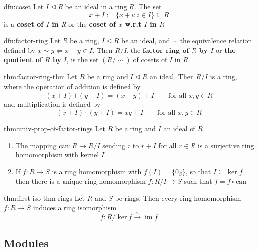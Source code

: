 \documentclass[landscape, 8pt]{extarticle}
\DeclareMathOperator{\im}{im}
\begin{document}
\begin{multicols}{3}
\begin{dfn}[Coset]{dfn:coset}{}
    Let $I \unlhd R$ be an ideal in a ring $R$. The set
    \[ x + I := \{x + i : i\in I\} \subseteq R\]
    is a \textbf{coset of $I$ in $R$} or the \textbf{coset of $x$ w.r.t $I$ in $R$}
\end{dfn}

\begin{dfn}{dfn:factor-ring}{}
    Let $R$ be a ring, $I \unlhd R$ be an ideal, and $\sim$ the equivalence relation defined by $x \sim y \iff x - y \in I$. Then $R / I$, the \textbf{factor ring of $R$ by $I$} or \textbf{the quotient of $R$ by $I$}, is the set $(R / \sim)$ of cosets of $I$ in $R$
\end{dfn}

\begin{thm}[]{thm:factor-ring-thm}{}
    Let $R$ be a ring and $I \unlhd R$ an ideal. Then $R / I$ is a ring, where the operation of addition is defined by
    \[(x + I) \dot{+} (y + I) = (x + y) + I \qquad \text{for all $x,y\in R$}\]
    and multiplication is defined by
    \[(x + I) \cdot (y + I) = xy + I \qquad \text{for all $x,y\in R$}\]
\end{thm}

\begin{thm}{thm:univ-prop-of-factor-rings}{}
    Let $R$ be a ring and $I$ an ideal of $R$
    \begin{enumerate}
        \setlength\itemsep{0em}
        \item The mapping $\text{can}: R \to R / I$ sending $r$ to $r + I$ for all $r\in R$ is a surjective ring homomorphism with kernel $I$
        \item If $f : R \to S$ is a ring homomorphism with $f(I) = \{0_{S}\}$, so that $I \subseteq \ker f$ then there is a unique ring homomorphism $f : R / I \to S$ such that $f = \overline{f} \circ \text{can}$
    \end{enumerate}
\end{thm}

\begin{thm}{thm:first-iso-thm-rings}{}
    Let $R$ and $S$ be rings. Then every ring homomorphism $f : R\to S$ induces a ring isomorphism
    \[\overline{f} : R / \ker f \xrightarrow{\sim} \im f\]
\end{thm}

\subsection{Modules}


\end{multicols}
\end{document}
